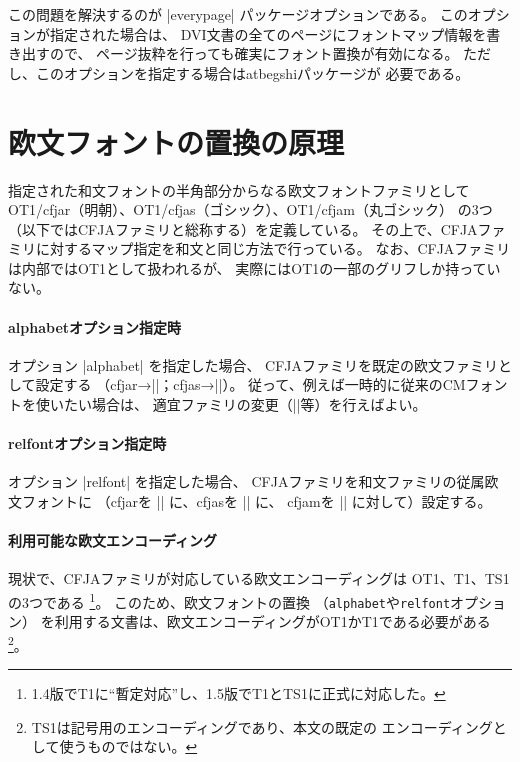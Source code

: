 \documentclass[uplatex,dvipdfmx,a4paper]{jsarticle}
\newcommand{\Pkg}[1]{\textsf{#1}}
\providecommand{\Strong}[1]{\textsf{#1}}
\begin{document}
この問題を解決するのが |everypage| パッケージオプションである。
このオプションが指定された場合は、
DVI文書の全てのページにフォントマップ情報を書き出すので、
ページ抜粋を行っても確実にフォント置換が有効になる。
ただし、このオプションを指定する場合は\Pkg{atbegshi}パッケージが
必要である。

\section{欧文フォントの置換の原理}
\label{sec:Mechanism-Alph}

指定された和文フォントの半角部分からなる欧文フォントファミリとして
OT1/cfjar（明朝）、OT1/cfjas（ゴシック）、OT1/cfjam（丸ゴシック）
の3つ（以下では\Strong{CFJAファミリ}と総称する）を定義している。
その上で、CFJAファミリに対するマップ指定を和文と同じ方法で行っている。
なお、CFJAファミリは内部ではOT1として扱われるが、
実際にはOT1の一部のグリフしか持っていない。

\paragraph{alphabetオプション指定時}
オプション |alphabet| を指定した場合、
CFJAファミリを既定の欧文ファミリとして設定する
（cfjar→|\rmdefault|；cfjas→|\sfdefault|）。
従って、例えば一時的に従来のCMフォントを使いたい場合は、
適宜ファミリの変更（||等）を行えばよい。

\paragraph{relfontオプション指定時}
オプション |relfont| を指定した場合、
CFJAファミリを和文ファミリの従属欧文フォントに
（cfjarを |\mcfamily| に、cfjasを |\gtfamily| に、
cfjamを |\mgfamily| に対して）設定する。

\paragraph{利用可能な欧文エンコーディング}
現状で、CFJAファミリが対応している欧文エンコーディングは
OT1、T1、TS1の3つである
\footnote{1.4版でT1に“暫定対応”し、1.5版でT1とTS1に正式に対応した。}。
このため、欧文フォントの置換
（\texttt{alphabet}や\texttt{relfont}オプション）
を利用する文書は、欧文エンコーディングがOT1かT1である必要がある
\footnote{TS1は記号用のエンコーディングであり、本文の既定の
エンコーディングとして使うものではない。}。
\end{document}
